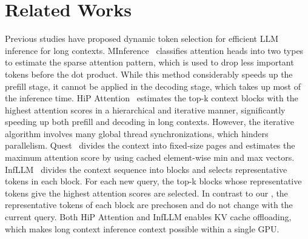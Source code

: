 \section{Related Works}
\label{related_works}

Previous studies have proposed dynamic token selection for efficient LLM inference for long contexts. MInference~\citep{jiang_minference_2024} classifies attention heads into two types to estimate the sparse attention pattern, which is used to drop less important tokens before the dot product.
While this method considerably speeds up the prefill stage, it cannot be applied in the decoding stage, which takes up most of the inference time.
%
HiP Attention~\citep{lee_training-free_2024} estimates the top-k context blocks with the highest attention scores in a hierarchical and iterative manner, significantly speeding up both prefill and decoding in long contexts. However, the iterative algorithm involves many global thread synchronizations, which hinders parallelism.
Quest~\citep{tang_quest_2024} divides the context into fixed-size pages and estimates the maximum attention score by using cached element-wise min and max vectors.
InfLLM~\citep{xiao_infllm_2024} divides the context sequence into blocks and selects representative tokens in each block. For each new query, the top-k blocks whose representative tokens give the highest attention scores are selected.
In contrast to our \ours, the representative tokens of each block are prechosen and do not change with the current query.
Both HiP Attention and InfLLM enables KV cache offloading, which makes long context inference context possible within a single GPU.

